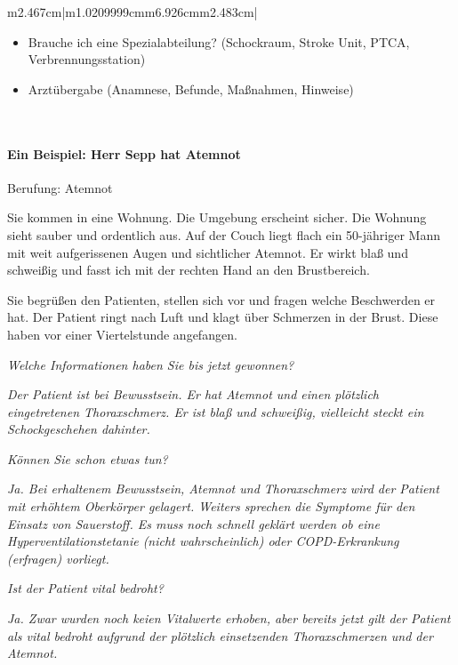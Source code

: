 \documentclass{article}
\newcommand\gH[1]{\textmd{\textcolor[rgb]{0.0,0.0,0.5019608}{#1}}}
\begin{document}
\begin{flushleft}
\begin{supertabular}{m{2.467cm}|m{1.0209999cm}m{6.926cm}m{2.483cm}|}
{\begin{itemize}
\item Brauche ich eine Spezialabteilung? (Schockraum, Stroke Unit, PTCA,
Verbrennungsstation)

\item Arzt\"ubergabe (Anamnese, Befunde, Ma{\ss}nahmen, Hinweise)

\end{itemize}
}\\\hline
\end{supertabular}
\end{flushleft}
\paragraph[Ein Beispiel: Herr Sepp hat Atemnot]{Ein Beispiel: Herr Sepp
hat Atemnot}
{\mdseries
Berufung: Atemnot}

{\mdseries
Sie kommen in eine Wohnung. Die Umgebung erscheint sicher. Die Wohnung
sieht sauber und ordentlich aus. Auf der Couch liegt flach ein
50-j\"ahriger Mann mit weit aufgerissenen Augen und sichtlicher
Atemnot. Er wirkt bla{\ss} und schwei{\ss}ig und fasst ich mit der
rechten Hand an den Brustbereich. }

{\mdseries
Sie begr\"u{\ss}en den Patienten, stellen sich vor und fragen welche
Beschwerden er hat. Der Patient ringt nach Luft und klagt \"uber
Schmerzen in der Brust. Diese haben vor einer Viertelstunde angefangen.
}

{\mdseries\itshape
Welche Informationen haben Sie bis jetzt gewonnen?}

{\mdseries\itshape
\gH{Der Patient ist bei Bewusstsein. Er hat Atemnot
und einen pl\"otzlich eingetretenen Thoraxschmerz. Er ist bla{\ss} und
schwei{\ss}ig, vielleicht steckt ein Schockgeschehen dahinter. }}

{\mdseries\itshape
K\"onnen Sie schon etwas tun?}

{\mdseries\itshape
\gH{Ja.  Bei erhaltenem Bewusstsein, Atemnot und
Thoraxschmerz wird der Patient mit erh\"ohtem Oberk\"orper gelagert.
Weiters sprechen die Symptome f\"ur den Einsatz von Sauerstoff. Es muss
noch schnell gekl\"art werden ob eine Hyperventilationstetanie (nicht
wahrscheinlich) oder COPD-Erkrankung (erfragen) vorliegt. }}

{\mdseries\itshape
Ist der Patient vital bedroht?}

{\mdseries\itshape
\gH{Ja. Zwar wurden noch keien Vitalwerte erhoben,
aber bereits jetzt gilt der Patient als vital bedroht aufgrund der
pl\"otzlich einsetzenden Thoraxschmerzen und der Atemnot. }}
\end{document}
